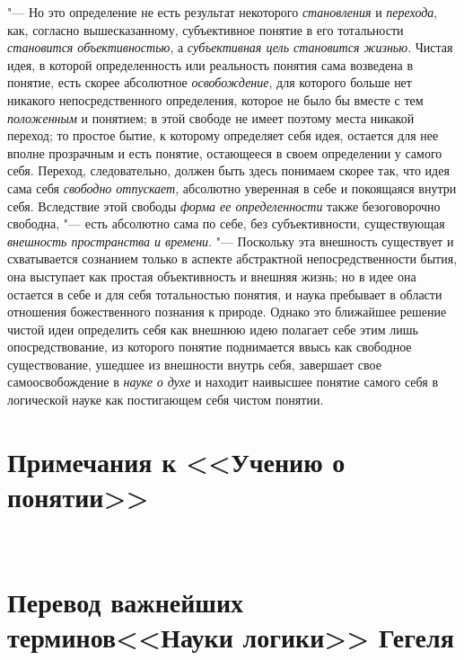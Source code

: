 "--- Но это определение не есть результат некоторого
{\em становления} и
{\em перехода}, как,
согласно вышесказанному, субъективное понятие в его тотальности
{\em становится объективностью},
а {\em субъективная цель
становится жизнью}. Чистая идея, в которой определенность
или реальность понятия сама возведена в понятие, есть скорее абсолютное
{\em освобождение}, для
которого больше нет никакого непосредственного определения, которое не было
бы вместе с тем {\em положенным}
и понятием; в этой свободе не имеет поэтому места никакой
переход; то простое бытие, к которому определяет себя идея, остается для
нее вполне прозрачным и есть понятие, остающееся в своем определении у
самого себя. Переход, следовательно, должен быть здесь понимаем скорее так,
что идея сама себя {\em свободно
отпускает}, абсолютно уверенная в себе и покоящаяся внутри
себя. Вследствие этой свободы {\em форма
ее определенности} также безоговорочно свободна, "---
есть абсолютно сама по себе, без субъективности, существующая
{\em внешность пространства и времени}.
"--- Поскольку эта внешность существует и схватывается
сознанием только в аспекте абстрактной непосредственности
бытия, она выступает как простая объективность и внешняя жизнь; но в идее
она остается в себе и для себя тотальностью понятия, и наука пребывает в
области отношения божественного познания к природе. Однако это ближайшее
решение чистой идеи определить себя как внешнюю идею полагает себе этим
лишь опосредствование, из которого понятие поднимается ввысь как свободное
существование, ушедшее из внешности внутрь себя, завершает свое
самоосвобождение в {\em науке о духе}
и находит наивысшее понятие самого себя в логической науке
как постигающем себя чистом понятии.

\clearpage
\chapter[Примечания к <<Учению о понятии>>]{Примечания к <<Учению о понятии>>}
\bigskip
\bigskip
\printpagenotes
\bigskip
\bigskip


\clearpage\
\chapter[Перевод важнейших терминов <<Науки логики>> Гегеля]
{Перевод важнейших терминов\newline<<Науки логики>> Гегеля}

\bigskip

